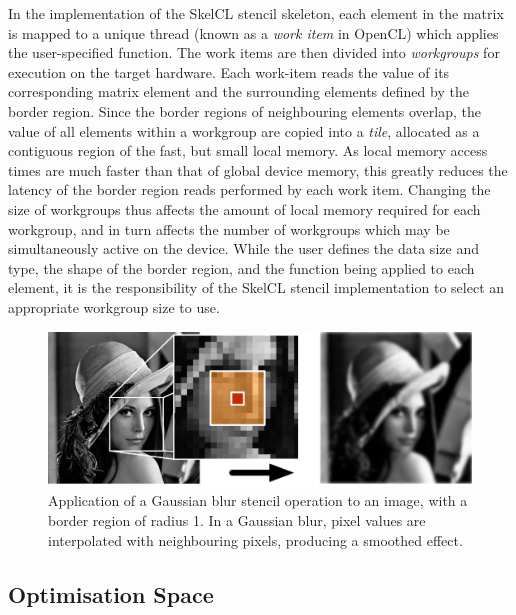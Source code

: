 \documentclass[nonatbib,preprint,9pt]{sigplanconf}
\begin{document}
In the implementation of the SkelCL stencil skeleton, each element in
the matrix is mapped to a unique thread (known as a \emph{work item}
in OpenCL) which applies the user-specified function. The work items
are then divided into \emph{workgroups} for execution on the target
hardware. Each work-item reads the value of its corresponding matrix
element and the surrounding elements defined by the border
region. Since the border regions of neighbouring elements overlap, the
value of all elements within a workgroup are copied into a
\emph{tile}, allocated as a contiguous region of the fast, but small
local memory. As local memory access times are much faster than that
of global device memory, this greatly reduces the latency of the
border region reads performed by each work item. Changing the size of
workgroups thus affects the amount of local memory required for each
workgroup, and in turn affects the number of workgroups which may be
simultaneously active on the device. While the user defines the data
size and type, the shape of the border region, and the function being
applied to each element, it is the responsibility of the SkelCL
stencil implementation to select an appropriate workgroup size to use.

\begin{figure}
\centering
\includegraphics[width=.98\columnwidth]{img/lena-stencil.pdf}
\caption{%
  Application of a Gaussian blur stencil operation to an image, with a
  border region of radius 1. In a Gaussian blur, pixel values are
  interpolated with neighbouring pixels, producing a smoothed effect.%
}
\label{fig:stencil-img}
\end{figure}


\subsection{Optimisation Space}\label{subsec:op-params}
\end{document}
